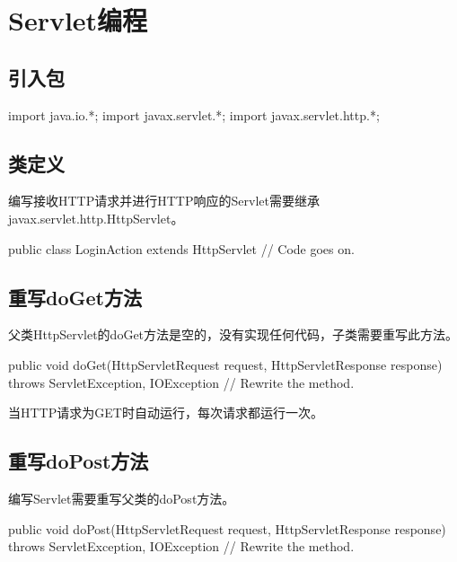 \section{Servlet编程}

\subsection{引入包} 

\begin{javaCode}
  import java.io.*;
  import javax.servlet.*;
  import javax.servlet.http.*;
\end{javaCode}

\subsection{类定义} 

编写接收HTTP请求并进行HTTP响应的Servlet需要继承javax.servlet.http.HttpServlet。

\begin{javaCode}
public class LoginAction extends HttpServlet {
  // Code goes on.
}
\end{javaCode}

\subsection{重写doGet方法} 

父类HttpServlet的doGet方法是空的，没有实现任何代码，子类需要重写此方法。

\begin{javaCode}

public void doGet(HttpServletRequest request, HttpServletResponse response) 
throws ServletException, IOException {
  // Rewrite the method.
}
\end{javaCode}

当HTTP请求为GET时自动运行，每次请求都运行一次。

\subsection{重写doPost方法} 

编写Servlet需要重写父类的doPost方法。

\begin{javaCode}
public void doPost(HttpServletRequest request, HttpServletResponse response)  
throws ServletException, IOException {
  // Rewrite the method.
}
\end{javaCode}

